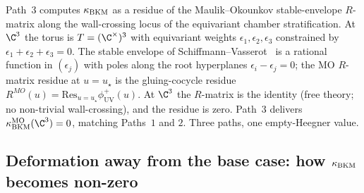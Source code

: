 \begin{remark}
\label{rem:bl-bv-c3-path3-consistency}
Path~$3$ computes $\kappa_{\mathrm{BKM}}$ as a residue of the Maulik--Okounkov
stable-envelope $R$-matrix along the wall-crossing locus of the
equivariant chamber stratification. At $\C^3$ the torus is
$T = (\C^\times)^3$ with equivariant weights $\epsilon_1, \epsilon_2,
\epsilon_3$ constrained by $\epsilon_1 + \epsilon_2 + \epsilon_3 = 0$.
The stable envelope of
Schiffmann--Vasserot~\cite{SchiffmannVasserot2013} is a rational
function in $(\epsilon_j)$ with poles along the root hyperplanes
$\epsilon_i - \epsilon_j = 0$; the MO $R$-matrix residue at
$u = u_\star$ is the gluing-cocycle residue
$R^{MO}(u) = \mathrm{Res}_{u = u_\star}\phi^+_{\mathrm{UV}}(u)$.
At $\C^3$ the $R$-matrix is the identity (free theory; no
non-trivial wall-crossing), and the residue is zero. Path~$3$
delivers $\kBKM^{\mathrm{MO}}(\C^3) = 0$, matching Paths~$1$ and
$2$. Three paths, one empty-Heegner value.
\end{remark}

\subsection*{Deformation away from the base case: how $\kappa_{\mathrm{BKM}}$ becomes non-zero}

